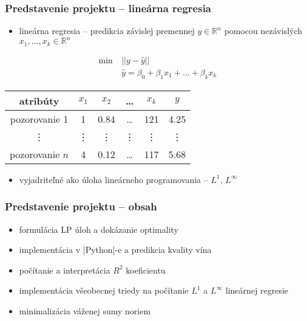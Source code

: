 \documentclass[presentation.tex]{subfiles}
\begin{document}
\begin{frame}

\frametitle{Predstavenie projektu -- lineárna regresia}
\begin{itemize}
	\item lineárna regresia -- predikcia závislej premennej $y \in \mathbb{R}^n$ pomocou nezávislých $x_1,\dots,x_k \in \mathbb{R}^n$
\end{itemize}
\begin{align*}
	\min~&||y - \hat{y}|| \\
	&\hat{y} = \beta_0 + \beta_1x_1 + \dots + \beta_kx_k
\end{align*}

\begin{center}
	\small
	\begin{tabular}{| c || c | c | c | c | c |}
		\hline
		atribúty & $x_1$ & $x_2$ & \dots & $x_k$ & $y$ \\
		\hline
		pozorovanie 1 & 1 & 0.84 & \dots & 121 & 4.25 \\
		\hline
		\vdots & \vdots & \vdots & \vdots & \vdots & \vdots \\
		\hline
		pozorovanie $n$ & 4 & 0.12 & \dots & 117 & 5.68 \\
		\hline
	\end{tabular}
\end{center}

\begin{itemize}
	\item vyjadriteľné ako úloha lineárneho programovania -- $L^1$, $L^{\infty}$
\end{itemize}

\end{frame}

\begin{frame}
	\frametitle{Predstavenie projektu -- obsah}

\begin{itemize}
	\item formulácia LP úloh a dokázanie optimality 
	\item implementácia v \pyth|Python|-e a predikcia kvality vína
	\item počítanie a interpretácia $R^2$ koeficientu
	\item implementácia všeobecnej triedy na počítanie $L^1$ a $L^{\infty}$ lineárnej regresie
	\item minimalizácia váženej sumy noriem
\end{itemize}

\end{frame}


	
\end{document}
